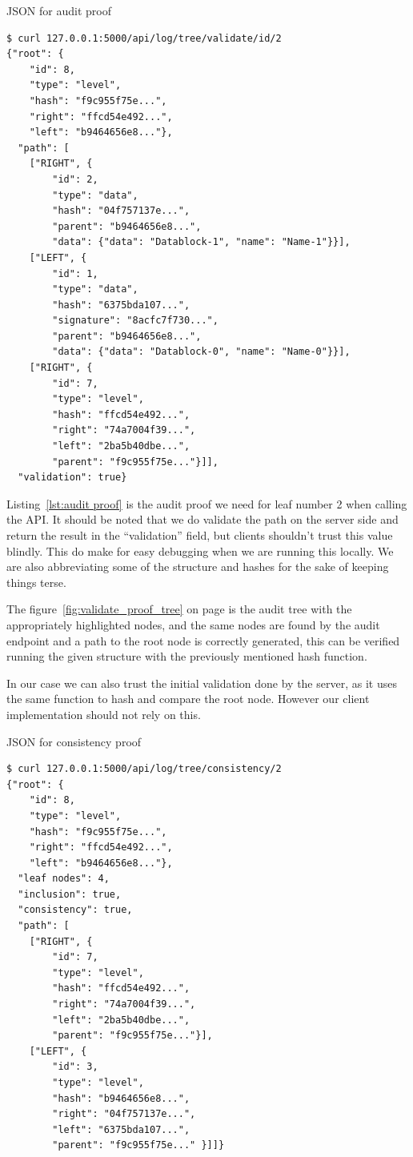\documentclass[../Main/thesis.tex]{subfiles}
\begin{document}
\begin{listing}[H]
\caption{JSON for audit proof}
\label{lst:audit proof}
\begin{verbatim}
$ curl 127.0.0.1:5000/api/log/tree/validate/id/2
{"root": {
    "id": 8,
    "type": "level",
    "hash": "f9c955f75e...",
    "right": "ffcd54e492...",
    "left": "b9464656e8..."},
  "path": [
    ["RIGHT", {
        "id": 2,
        "type": "data",
        "hash": "04f757137e...",
        "parent": "b9464656e8...",
        "data": {"data": "Datablock-1", "name": "Name-1"}}],
    ["LEFT", {
        "id": 1,
        "type": "data",
        "hash": "6375bda107...",
        "signature": "8acfc7f730...",
        "parent": "b9464656e8...",
        "data": {"data": "Datablock-0", "name": "Name-0"}}],
    ["RIGHT", {
        "id": 7,
        "type": "level",
        "hash": "ffcd54e492...",
        "right": "74a7004f39...",
        "left": "2ba5b40dbe...",
        "parent": "f9c955f75e..."}]],
  "validation": true}
\end{verbatim}
\end{listing}

Listing~\ref{lst:audit proof} is the audit proof we need for leaf number 2 when
calling the API. It should be noted that we do validate the path on the server
side and return the result in the ``validation'' field, but clients shouldn't
trust this value blindly. This do make for easy debugging when we are running
this locally. We are also abbreviating some of the structure and hashes for the
sake of keeping things terse.

The figure~\ref{fig:validate_proof_tree} on page
\pageref{fig:validate_proof_tree} is the audit tree with the appropriately
highlighted nodes, and the same nodes are found by the audit endpoint and a path
to the root node is correctly generated, this can be verified running the given
structure with the previously mentioned hash function.

In our case we can also trust the initial validation done by the server, as it
uses the same function to hash and compare the root node. However our client
implementation should not rely on this.


\begin{listing}[H]
\caption{JSON for consistency proof}
\label{lst:consistency proof}
\begin{verbatim}
$ curl 127.0.0.1:5000/api/log/tree/consistency/2
{"root": {
    "id": 8,
    "type": "level",
    "hash": "f9c955f75e...",
    "right": "ffcd54e492...",
    "left": "b9464656e8..."},
  "leaf nodes": 4,
  "inclusion": true,
  "consistency": true,
  "path": [
    ["RIGHT", {
        "id": 7,
        "type": "level",
        "hash": "ffcd54e492...",
        "right": "74a7004f39...",
        "left": "2ba5b40dbe...",
        "parent": "f9c955f75e..."}],
    ["LEFT", {
        "id": 3,
        "type": "level",
        "hash": "b9464656e8...",
        "right": "04f757137e...",
        "left": "6375bda107...",
        "parent": "f9c955f75e..." }]]}
\end{verbatim}
\end{listing}
\end{document}
